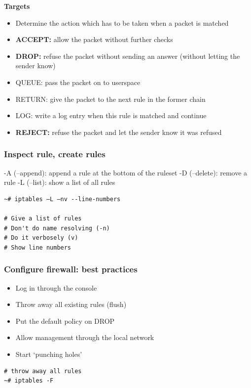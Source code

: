 \documentclass{article}
\begin{document}
\textbf{Targets}

\begin{itemize}
    \item Determine the action which has to be taken when a packet is matched
    \item \textbf{ACCEPT:} allow the packet without further checks
    \item \textbf{DROP:} refuse the packet without sending an answer (without letting the sender know)
    \item QUEUE: pass the packet on to userspace
    \item RETURN: give the packet to the next rule in the former chain
    \item LOG: write a log entry when this rule is matched and continue
    \item \textbf{REJECT:} refuse the packet and let the sender know it was refused
\end{itemize}

\subsubsection{Inspect rule, create rules}

-A (--append): append a rule at the bottom of the ruleset
-D (--delete): remove a rule
-L (--list): show a list of all rules

\begin{verbatim}
~# iptables –L –nv --line-numbers

# Give a list of rules
# Don't do name resolving (-n)
# Do it verbosely (v)
# Show line numbers
\end{verbatim}

\subsubsection{Configure firewall: best practices}

\begin{itemize}
    \item Log in through the console
    \item Throw away all existing rules (flush)
    \item Put the default policy on DROP
    \item Allow management through the local network
    \item Start `punching holes'
\end{itemize}

\begin{verbatim}
# throw away all rules
~# iptables -F
\end{verbatim}
\end{document}
